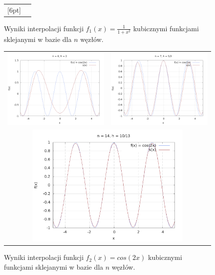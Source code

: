 \begin{figure}[h!]
\begin{tabular}{cc}
		[6pt]
	\end{tabular}
	\caption{Wyniki interpolacji funkcji $ f_1(x) = \frac{1}{1 + x^2} $ kubicznymi funkcjami sklejanymi w bazie dla $ n $ węzłów.}
	\label{pierwsza} 
\end{figure}
\begin{figure}[h!]
	\begin{tabular}{cc}
		\includegraphics[width=81mm]{f2n6.png} &   \includegraphics[width=81mm]{f2n7.png} \\
[6pt]
		\multicolumn{2}{c}{\centering\includegraphics[width=81mm]{f2n14.png}}
	\end{tabular}
	\caption{Wyniki interpolacji funkcji $ f_2(x) = cos(2x) $ kubicznymi funkcjami sklejanymi w bazie dla $ n $ węzłów.}
	\label{druga}
\end{figure}

